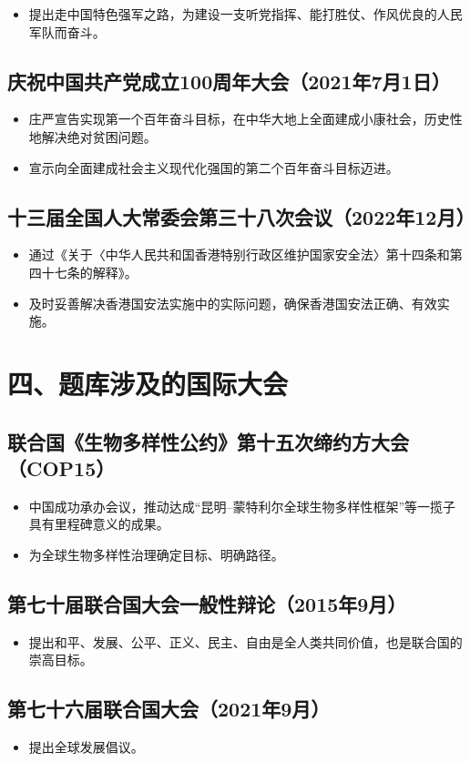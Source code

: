 \documentclass[12pt,a4paper]{ctexart}
\begin{document}
\begin{itemize}
\item 提出走中国特色强军之路，为建设一支听党指挥、能打胜仗、作风优良的人民军队而奋斗。
\end{itemize}

\subsection*{庆祝中国共产党成立100周年大会（2021年7月1日）}

\begin{itemize}
\item 庄严宣告实现第一个百年奋斗目标，在中华大地上全面建成小康社会，历史性地解决绝对贫困问题。
\item 宣示向全面建成社会主义现代化强国的第二个百年奋斗目标迈进。
\end{itemize}

\subsection*{十三届全国人大常委会第三十八次会议（2022年12月）}

\begin{itemize}
\item 通过《关于〈中华人民共和国香港特别行政区维护国家安全法〉第十四条和第四十七条的解释》。
\item 及时妥善解决香港国安法实施中的实际问题，确保香港国安法正确、有效实施。
\end{itemize}

\section*{四、题库涉及的国际大会}

\subsection*{联合国《生物多样性公约》第十五次缔约方大会（COP15）}

\begin{itemize}
\item 中国成功承办会议，推动达成“昆明--蒙特利尔全球生物多样性框架”等一揽子具有里程碑意义的成果。
\item 为全球生物多样性治理确定目标、明确路径。
\end{itemize}

\subsection*{第七十届联合国大会一般性辩论（2015年9月）}

\begin{itemize}
\item 提出和平、发展、公平、正义、民主、自由是全人类共同价值，也是联合国的崇高目标。
\end{itemize}

\subsection*{第七十六届联合国大会（2021年9月）}

\begin{itemize}
\item 提出全球发展倡议。
\end{itemize}
\end{document}
